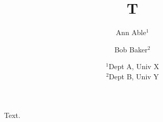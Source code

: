 \documentclass{amsart}
\author{Ann Able$^1$}\author{Bob Baker$^2$}
\title{T}
\date{$^1$Dept A, Univ X\\ $^2$Dept B, Univ Y}
\begin{document}
\maketitle
Text.
\end{document}

